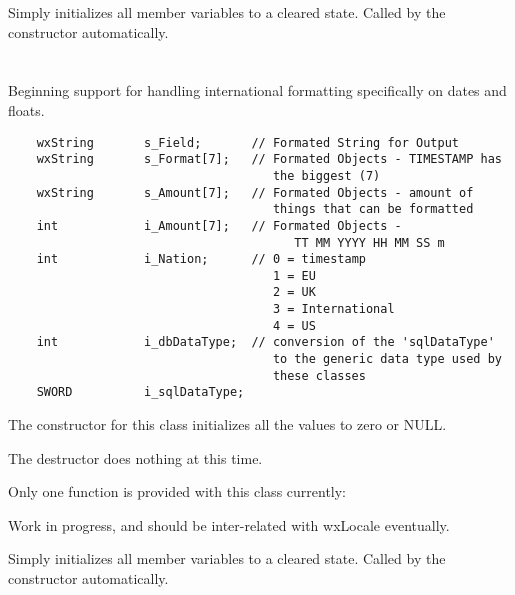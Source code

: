 Simply initializes all member variables to a cleared state.  Called by 
the constructor automatically.



\section{}\label{wxdbcolfor}

Beginning support for handling international formatting specifically on dates 
and floats.  

\begin{verbatim}
    wxString       s_Field;       // Formated String for Output
    wxString       s_Format[7];   // Formated Objects - TIMESTAMP has 
                                     the biggest (7)
    wxString       s_Amount[7];   // Formated Objects - amount of 
                                     things that can be formatted
    int            i_Amount[7];   // Formated Objects - 
                                        TT MM YYYY HH MM SS m
    int            i_Nation;      // 0 = timestamp
                                     1 = EU
                                     2 = UK
                                     3 = International
                                     4 = US
    int            i_dbDataType;  // conversion of the 'sqlDataType'
                                     to the generic data type used by
                                     these classes
    SWORD          i_sqlDataType;
\end{verbatim}

The constructor for this class initializes all the values to zero or NULL.

The destructor does nothing at this time.

Only one function is provided with this class currently:


\label{wxdbcolforformat}

\label{wxdbcolforformat}

Work in progress, and should be inter-related with wxLocale eventually.


\label{wxdbcolforinitialize}

Simply initializes all member variables to a cleared state.  Called by 
the constructor automatically.


